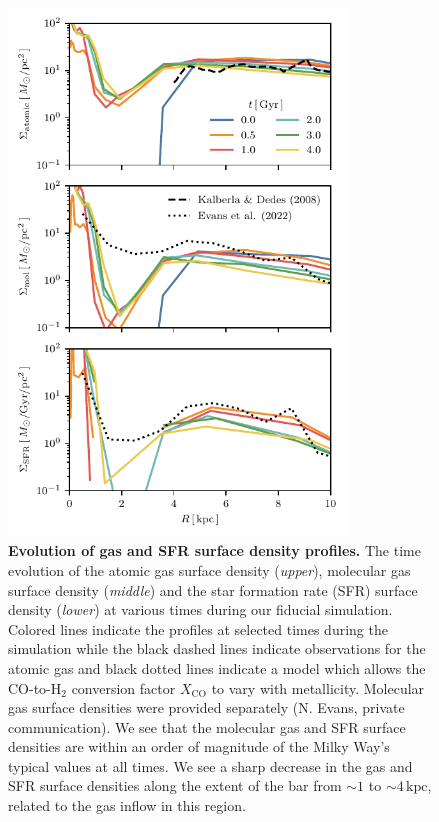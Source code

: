 \documentclass{natureprintstyle}
\begin{document}
\begin{figure}[t!]%
\centering
\includegraphics[width=9cm]{fig/fig-surf.pdf}
\caption{\textbf{Evolution of gas and SFR surface density profiles.} The time
evolution of the atomic gas surface density (\textit{upper}), molecular gas
surface density (\textit{middle}) and the star formation rate (SFR) surface
density (\textit{lower}) at various times during our fiducial simulation.
Colored lines indicate the profiles at selected times during the simulation
while the black dashed lines indicate observations for the atomic
gas\cite{2008AA...487..951K} and black dotted lines indicate a model which
allows the CO-to-H$_2$ conversion factor $X_{\textrm{CO}}$ to vary with
metallicity.\cite{2022ApJ...929L..18E} Molecular gas surface densities were
provided separately (N. Evans, private communication). We see that the
molecular gas and SFR surface densities are within an order of magnitude of
the Milky Way's typical values at all times.  We see a sharp decrease in the
gas and SFR surface densities along the extent of the bar from $\sim1$ to
$\sim4\,\textrm{kpc}$, related to the gas inflow in this region.}
\label{fig:surf}
\end{figure}

\vspace{12pt}
\end{document}
